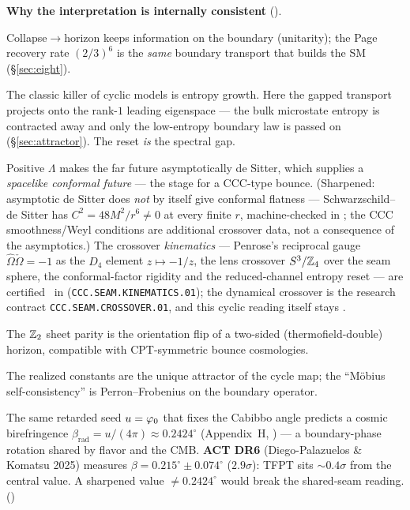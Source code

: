 \par\smallskip\noindent\textbf{Why the interpretation is internally consistent} (\mC).
\begin{description}[leftmargin=2.0em,style=nextline]
\item[\textnormal{Information.}] Collapse$\to$horizon keeps information on the boundary (unitarity); the
Page recovery rate $(2/3)^6$ is the \emph{same} boundary transport that builds the SM (\S\ref{sec:eight}).
\item[\textnormal{Entropy reset (Tolman).}] The classic killer of cyclic models is entropy growth. Here the
gapped transport projects onto the rank-$1$ leading eigenspace --- the bulk microstate entropy is
contracted away and only the low-entropy boundary law is passed on (\S\ref{sec:attractor}). The reset
\emph{is} the spectral gap.
\item[\textnormal{Penrose CCC.}] Positive $\Lambda$ makes the far future asymptotically de Sitter,
which supplies a \emph{spacelike conformal future} --- the stage for a CCC-type bounce.  (Sharpened:
asymptotic de Sitter does \emph{not} by itself give conformal flatness --- Schwarzschild--de Sitter has
$C^2=48M^2/r^6\neq0$ at every finite $r$, machine-checked in ;
the CCC smoothness/Weyl conditions are additional crossover data, not a consequence of the asymptotics.)
The crossover \emph{kinematics} --- Penrose's reciprocal gauge $\hat\Omega\check\Omega=-1$ as the
$D_4$ element $z\mapsto-1/z$, the lens crossover $S^3/\mathbb Z_4$ over the seam sphere, the conformal-factor
rigidity and the reduced-channel entropy reset --- are certified \mE\ in
 (\texttt{CCC.SEAM.KINEMATICS.01}); the dynamical crossover is
the research contract \texttt{CCC.SEAM.CROSSOVER.01}, and this cyclic reading itself stays \mC.
\item[\textnormal{CPT / Möbius.}] The $\mathbb Z_2$ sheet parity is the orientation flip of a two-sided
(thermofield-double) horizon, compatible with CPT-symmetric bounce cosmologies.
\item[\textnormal{Selection.}] The realized constants are the unique attractor of the cycle map; the
``Möbius self-consistency'' is Perron--Frobenius on the boundary operator.
\item[\textnormal{A live fossil.}] The same retarded seed $u=\varphi_0$ that fixes the Cabibbo angle predicts a
cosmic birefringence $\beta_{\mathrm{rad}}=u/(4\pi)\approx0.2424^\circ$ (Appendix~H, \mE) --- a
boundary-phase rotation shared by flavor and the CMB. \textbf{ACT DR6} (Diego-Palazuelos \& Komatsu 2025)
measures $\beta=0.215^\circ\pm0.074^\circ$ ($2.9\sigma$): TFPT sits $\sim0.4\sigma$ from the central value.
A sharpened value $\neq0.2424^\circ$ would break the shared-seam reading. ()
\end{description}

